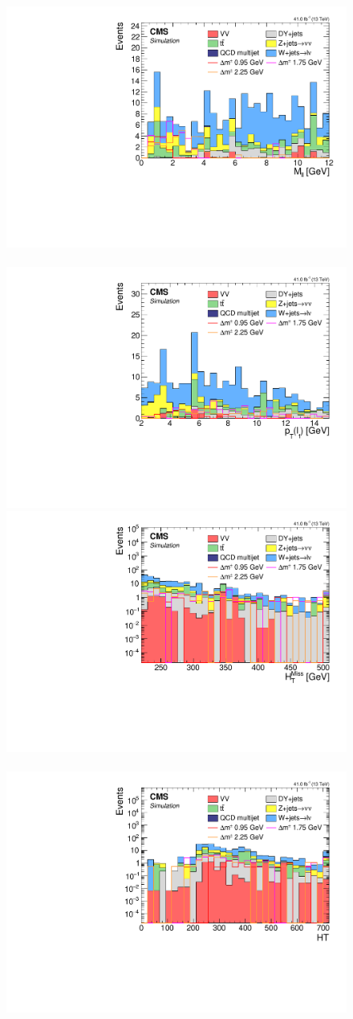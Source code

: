 \begin{figure}[!htb]
\centering
\includegraphics[width=0.48\linewidth]{plots/dilepton_muons_2017/none_invMassCorrJetNoMultIso10Dr0.6.pdf} \,
\includegraphics[width=0.48\linewidth]{plots/dilepton_muons_2017/none_leptonsCorrJetNoMultIso10Dr0.6[0].Pt(.pdf} \\

\includegraphics[width=0.48\linewidth]{plots/dilepton_muons_2017/none_MHT_log.pdf} \,
\includegraphics[width=0.48\linewidth]{plots/dilepton_muons_2017/none_HT_log.pdf} \\



\end{figure}
